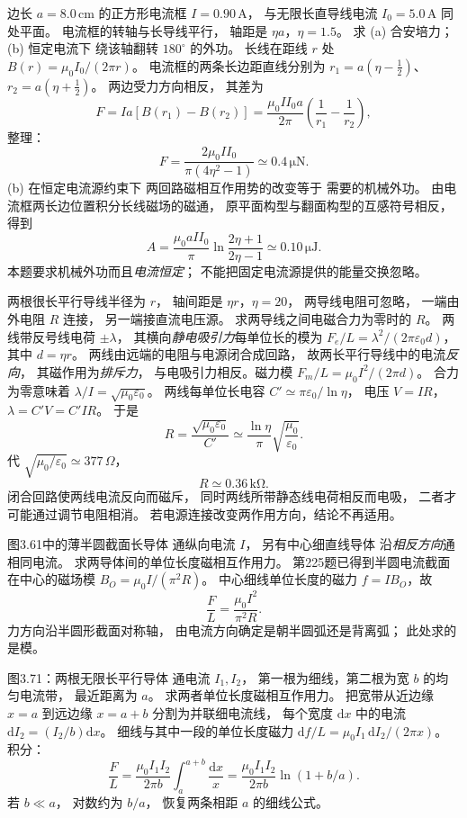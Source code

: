 边长 $a=8.0\,\mathrm{cm}$ 的正方形电流框
$I=0.90\,\mathrm A$，
与无限长直导线电流
$I_0=5.0\,\mathrm A$ 同处平面。
电流框的转轴与长导线平行，
轴距是 $\eta a$，$\eta=1.5$。
求 (a) 合安培力；(b) 恒定电流下
绕该轴翻转 $180^\circ$ 的外功。
\exsolution
长线在距线 $r$ 处
$B(r)=\mu_0I_0/(2\pi r)$。
电流框的两条长边距直线分别为
$r_1=a(\eta-\tfrac12)$、
$r_2=a(\eta+\tfrac12)$。
两边受力方向相反，
其差为
\[
F=Ia[B(r_1)-B(r_2)]
=\frac{\mu_0II_0a}{2\pi}
\left(\frac1{r_1}-\frac1{r_2}\right),
\]
整理：
\[
\boxed{F=\frac{2\mu_0II_0}{\pi(4\eta^2-1)}
\simeq0.4\,\mathrm{\mu N}}.
\]
(b) 在恒定电流源约束下
两回路磁相互作用势的改变等于
需要的机械外功。
由电流框两长边位置积分长线磁场的磁通，
原平面构型与翻面构型的互感符号相反，
得到
\[
\boxed{A=\frac{\mu_0aII_0}{\pi}
\ln\frac{2\eta+1}{2\eta-1}
\simeq0.10\,\mathrm{\mu J}}.
\]
\excheck 本题要求机械外功而且\emph{电流恒定}；
不能把固定电流源提供的能量交换忽略。

两根很长平行导线半径为 $r$，
轴间距是 $\eta r$，$\eta=20$，
两导线电阻可忽略，
一端由外电阻 $R$ 连接，
另一端接直流电压源。
求两导线之间电磁合力为零时的 $R$。
\exsolution
两线带反号线电荷 $\pm\lambda$，
其横向\emph{静电吸引力}每单位长的模为
$F_e/L=\lambda^2/(2\pi\varepsilon_0d)$，
其中 $d=\eta r$。
两线由远端的电阻与电源闭合成回路，
故两长平行导线中的电流\emph{反向}，
其磁作用为\emph{排斥力}，
与电吸引力相反。磁力模
$F_m/L=\mu_0I^2/(2\pi d)$。
合力为零意味着
$\lambda/I=\sqrt{\mu_0\varepsilon_0}$。
两线每单位长电容
$C'\simeq\pi\varepsilon_0/\ln\eta$，
电压 $V=IR$，
$\lambda=C'V=C'IR$。
于是
\[
\boxed{R=
\frac{\sqrt{\mu_0\varepsilon_0}}{C'}
\simeq\frac{\ln\eta}{\pi}
\sqrt{\frac{\mu_0}{\varepsilon_0}}}.
\]
代 $\sqrt{\mu_0/\varepsilon_0}
\simeq377\,\Omega$，
\[
\boxed{R\simeq0.36\,\mathrm{k\Omega}}.
\]
\excheck 闭合回路使两线电流反向而磁斥，
同时两线所带静态线电荷相反而电吸，
二者才可能通过调节电阻相消。
若电源连接改变两作用方向，结论不再适用。

图3.61中的薄半圆截面长导体
通纵向电流 $I$，
另有中心细直线导体
沿\emph{相反方向}通相同电流。
求两导体间的单位长度磁相互作用力。
\exsolution
第225题已得到半圆电流截面
在中心的磁场模
$B_O=\mu_0I/(\pi^2R)$。
中心细线单位长度的磁力
$f=I B_O$，故
\[
\boxed{\frac FL=\frac{\mu_0I^2}{\pi^2R}}.
\]
\excheck 力方向沿半圆形截面对称轴，
由电流方向确定是朝半圆弧还是背离弧；
此处求的是模。

图3.71：两根无限长平行导体
通电流 $I_1,I_2$，
第一根为细线，第二根为宽 $b$
的均匀电流带，
最近距离为 $a$。
求两者单位长度磁相互作用力。
\exsolution
把宽带从近边缘 $x=a$
到远边缘 $x=a+b$
分割为并联细电流线，
每个宽度 $\mathrm dx$
中的电流
$\mathrm dI_2=(I_2/b)\mathrm dx$。
细线与其中一段的单位长度磁力
$\mathrm df/L=
\mu_0I_1\,\mathrm dI_2/(2\pi x)$。
积分：
\[
\frac FL=
\frac{\mu_0I_1I_2}{2\pi b}
\int_a^{a+b}\frac{\mathrm dx}{x}
=\boxed{\frac{\mu_0I_1I_2}{2\pi b}
\ln(1+b/a)}.
\]
\excheck 若 $b\ll a$，
对数约为 $b/a$，
恢复两条相距 $a$ 的细线公式。

